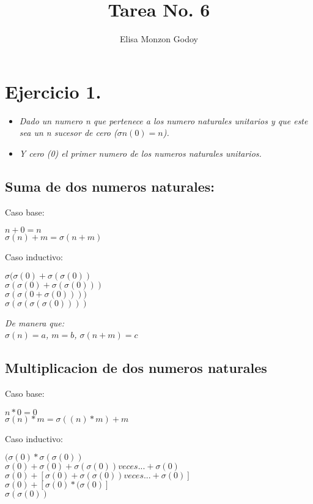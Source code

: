 \documentclass{article}
\author{Elisa Monzon Godoy}
\title{Tarea No. 6}
\begin{document}
\maketitle
\section{Ejercicio 1.}
\begin{itemize}
\item\textit{Dado un numero n que pertenece a los numero naturales unitarios y que este sea un n sucesor de cero ($\sigma n(0) = n$).}
\item\textit{Y cero (0) el primer numero de los numeros naturales unitarios.}
\end{itemize}
\subsection{Suma de dos numeros naturales:}
Caso base: 
\begin{center}
$n + 0 = n$\\
$\sigma(n) + m = \sigma(n+m)$
\end{center}
Caso inductivo:
\begin{center}
$\sigma(\sigma(0) + \sigma(\sigma(0))$\\
$\sigma(\sigma(0) +\sigma(\sigma(0))) $\\
$\sigma(\sigma(0+\sigma(0))))$\\
$\sigma(\sigma(\sigma(\sigma(0))))$
\end{center}
\emph{De manera que:\\
$\sigma(n) = a$, $m = b$, $\sigma(n+m)= c$}
\subsection{Multiplicacion de dos numeros naturales}
Caso base: 
\begin{center}
$n * 0 =0$\\
$\sigma(n) * m = \sigma((n)*m) +m$\\
\end{center}
Caso inductivo:
\begin{center}
$(\sigma(0) * \sigma(\sigma(0))$\\
$\sigma(0) + \sigma(0) + \sigma(\sigma(0))veces...+\sigma(0)$\\
$\sigma(0) + [\sigma(0) + \sigma(\sigma(0))veces...+\sigma(0)] $\\
$\sigma(0)+ [\sigma(0) * (\sigma(0)] $\\
$\sigma(\sigma(0))$
\end{center}
\end{document}
